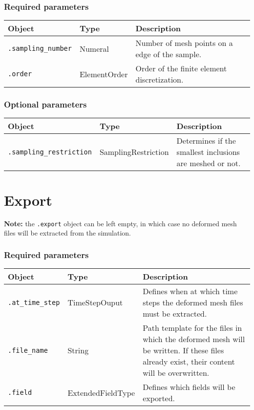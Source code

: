\documentclass[10pt]{article}
\begin{document}
\subsubsection*{Required parameters}

\begin{tabularx}{\textwidth}{llX}
\hline 
Object & Type & Description \\ 
\hline 
\verb+.sampling_number+ & Numeral & Number of mesh points on a edge of the sample. \\ 
\verb+.order+ & ElementOrder & Order of the finite element discretization.\\
\hline 
\end{tabularx}

\subsubsection*{Optional parameters}

\begin{tabularx}{\textwidth}{llX}
\hline 
Object & Type & Description \\ 
\hline 
\verb+.sampling_restriction+ & SamplingRestriction & Determines if the smallest inclusions are meshed or not. \\ 
\hline 
\end{tabularx} 

\section{Export}

\textbf{Note:} the \verb+.export+ object can be left empty, in which case no deformed mesh files will be extracted from the simulation.

\subsubsection*{Required parameters}

\begin{tabularx}{\textwidth}{llX}
\hline 
Object & Type & Description \\ 
\hline 
\verb+.at_time_step+ & TimeStepOuput & Defines when at which time steps the deformed mesh files must be extracted. \\ 
\verb+.file_name+ & String & Path template for the files in which the deformed mesh will be written. If these files already exist, their content will be overwritten.\\ 
\verb+.field+ & ExtendedFieldType & Defines which fields will be exported.\\
\hline 
\end{tabularx}
\end{document}
